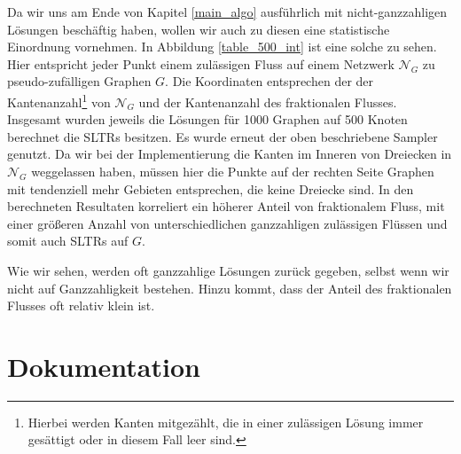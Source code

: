 Da wir uns am Ende von Kapitel \ref{main_algo} ausführlich mit nicht-ganzzahligen Lösungen beschäftig haben, wollen wir auch zu diesen eine statistische Einordnung vornehmen. In Abbildung \ref{table_500_int} ist eine solche zu sehen. Hier entspricht jeder Punkt einem zulässigen Fluss auf einem Netzwerk $\mathcal{N}_G$ zu pseudo-zufälligen Graphen $G$. Die Koordinaten entsprechen der der Kantenanzahl\footnote{Hierbei werden Kanten mitgezählt, die in einer zulässigen Lösung immer gesättigt oder in diesem Fall leer sind.} von $\mathcal{N}_G$ und der Kantenanzahl des fraktionalen Flusses. Insgesamt wurden jeweils die Lösungen für 1000 Graphen auf 500 Knoten berechnet die SLTRs besitzen. Es wurde erneut der oben beschriebene Sampler genutzt. Da wir bei der Implementierung die Kanten im Inneren von Dreiecken in$\mathcal{N}_G$ weggelassen haben, müssen hier die Punkte auf der rechten Seite Graphen mit tendenziell mehr Gebieten entsprechen, die keine Dreiecke sind. In den berechneten Resultaten korreliert ein höherer Anteil von fraktionalem Fluss, mit einer größeren Anzahl von unterschiedlichen ganzzahligen zulässigen Flüssen und somit auch SLTRs auf $G$.



Wie wir sehen, werden oft ganzzahlige Lösungen zurück gegeben, selbst wenn wir nicht auf Ganzzahligkeit bestehen. Hinzu kommt, dass der Anteil des fraktionalen Flusses oft relativ klein ist.

\section{Dokumentation}


